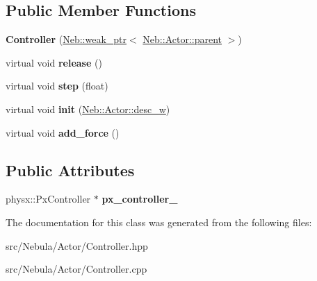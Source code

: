 \subsection*{\-Public \-Member \-Functions}
\begin{DoxyCompactItemize}
\item 
\hypertarget{classNeb_1_1Actor_1_1Controller_ac872fdf65f915761b1aed60ca8a835de}{{\bfseries \-Controller} (\hyperlink{classNeb_1_1weak__ptr}{\-Neb\-::weak\-\_\-ptr}$<$ \hyperlink{classNeb_1_1Actor_1_1parent}{\-Neb\-::\-Actor\-::parent} $>$)}\label{classNeb_1_1Actor_1_1Controller_ac872fdf65f915761b1aed60ca8a835de}

\item 
\hypertarget{classNeb_1_1Actor_1_1Controller_a4cf7cbd70138ea33c509d89ebc74e45d}{virtual void {\bfseries release} ()}\label{classNeb_1_1Actor_1_1Controller_a4cf7cbd70138ea33c509d89ebc74e45d}

\item 
\hypertarget{classNeb_1_1Actor_1_1Controller_a37d671a837e578ee05e2f9e1a5292e79}{virtual void {\bfseries step} (float)}\label{classNeb_1_1Actor_1_1Controller_a37d671a837e578ee05e2f9e1a5292e79}

\item 
\hypertarget{classNeb_1_1Actor_1_1Controller_abd3a89e2acfc654033cd70bbec7491a6}{virtual void {\bfseries init} (\hyperlink{classNeb_1_1weak__ptr}{\-Neb\-::\-Actor\-::desc\-\_\-w})}\label{classNeb_1_1Actor_1_1Controller_abd3a89e2acfc654033cd70bbec7491a6}

\item 
\hypertarget{classNeb_1_1Actor_1_1Controller_aed64790b9ac840ebb4e6da3af3a6e405}{virtual void {\bfseries add\-\_\-force} ()}\label{classNeb_1_1Actor_1_1Controller_aed64790b9ac840ebb4e6da3af3a6e405}

\end{DoxyCompactItemize}
\subsection*{\-Public \-Attributes}
\begin{DoxyCompactItemize}
\item 
\hypertarget{classNeb_1_1Actor_1_1Controller_a488fba03acad68f997a3f38f4fac41fd}{physx\-::\-Px\-Controller $\ast$ {\bfseries px\-\_\-controller\-\_\-}}\label{classNeb_1_1Actor_1_1Controller_a488fba03acad68f997a3f38f4fac41fd}

\end{DoxyCompactItemize}


\-The documentation for this class was generated from the following files\-:\begin{DoxyCompactItemize}
\item 
src/\-Nebula/\-Actor/\-Controller.\-hpp\item 
src/\-Nebula/\-Actor/\-Controller.\-cpp\end{DoxyCompactItemize}
